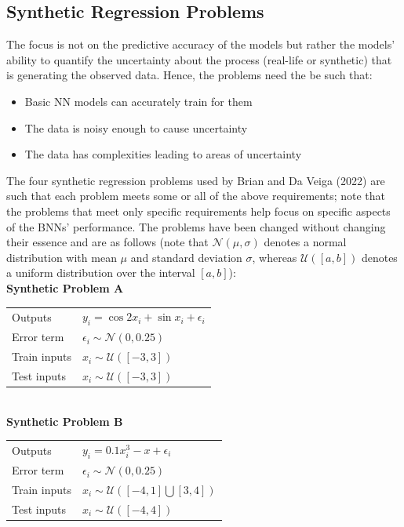 \documentclass[conference]{IEEEtran}
\begin{document}
\subsection{Synthetic Regression Problems}
The focus is not on the predictive accuracy of the models but rather the models' ability to quantify the uncertainty about the process (real-life or synthetic) that is generating the observed data. Hence, the problems need the be such that:\\

\begin{itemize}
    \item Basic NN models can accurately train for them
    \item The data is noisy enough to cause uncertainty
    \item The data has complexities leading to areas of uncertainty\\
\end{itemize}

The four synthetic regression problems used by Brian and Da Veiga (2022) are such that each problem meets some or all of the above requirements; note that the problems that meet only specific requirements help focus on specific aspects of the BNNs' performance. The problems have been changed without changing their essence and are as follows (note that $\mathcal{N}(\mu, \sigma)$ denotes a normal distribution with mean $\mu$ and standard deviation $\sigma$, whereas $\mathcal{U}([a, b])$ denotes a uniform distribution over the interval $[a, b]$):\\

\textbf{Synthetic Problem A}

\begin{tabular}{m{2.5cm} | m{6cm}}
    Outputs & $y_i = \cos{2x_i} + \sin{x_i} + \epsilon_i$\\
    Error term & $\epsilon_i \sim \mathcal{N}(0, 0.25)$\\
    Train inputs & $x_i \sim \mathcal{U}([-3, 3])$\\
    Test inputs & $x_i \sim \mathcal{U}([-3, 3])$
\end{tabular}\\

\textbf{Synthetic Problem B}

\begin{tabular}{m{2.5cm} | m{6cm}}
    Outputs & $y_i = 0.1x_i^3 - x + \epsilon_i$\\
    Error term & $\epsilon_i \sim \mathcal{N}(0, 0.25)$\\
    Train inputs & $x_i \sim \mathcal{U}([-4, 1] \bigcup [3, 4])$\\
    Test inputs & $x_i \sim \mathcal{U}([-4, 4])$
\end{tabular}\\
\end{document}
